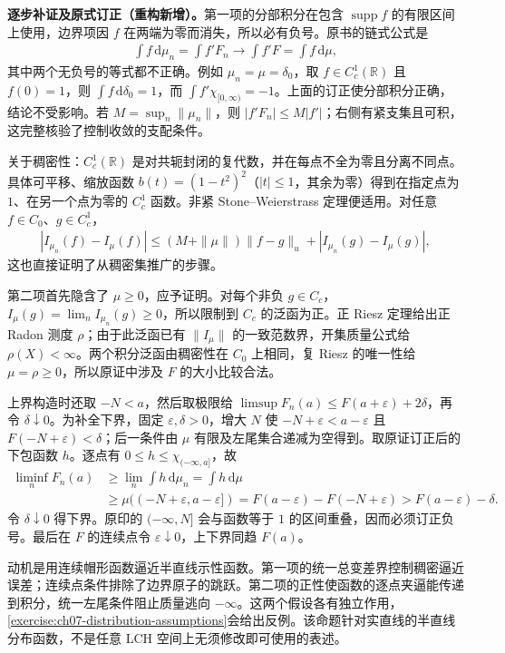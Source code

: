 \documentclass[../../main.tex]{subfiles}
\begin{document}
\begin{remark}
\textbf{逐步补证及原式订正（重构新增）。}第一项的分部积分在包含 $\operatorname{supp}f$ 的有限区间上使用，边界项因 $f$ 在两端为零而消失，所以必有负号。原书的链式公式是
\begin{align*}
\int f\,\mathrm d\mu_n=\int f'F_n\longrightarrow\int f'F=\int f\,\mathrm d\mu,
\end{align*}
其中两个无负号的等式都不正确。例如 $\mu_n=\mu=\delta_0$，取 $f\in C_c^1(\mathbb R)$ 且 $f(0)=1$，则 $\int f\,\mathrm d\delta_0=1$，而 $\int f'\chi_{[0,\infty)}=-1$。上面的订正使分部积分正确，结论不受影响。若 $M=\sup_n\|\mu_n\|$，则 $|f'F_n|\leqslant M|f'|$；右侧有紧支集且可积，这完整核验了控制收敛的支配条件。

关于稠密性：$C_c^1(\mathbb R)$ 是对共轭封闭的复代数，并在每点不全为零且分离不同点。具体可平移、缩放函数 $b(t)=(1-t^2)^2$（$|t|\leqslant1$，其余为零）得到在指定点为 $1$、在另一个点为零的 $C_c^1$ 函数。非紧 Stone--Weierstrass 定理便适用。对任意 $f\in C_0$、$g\in C_c^1$，
\begin{align*}
|I_{\mu_n}(f)-I_\mu(f)|\leqslant(M+\|\mu\|)\|f-g\|_u+|I_{\mu_n}(g)-I_\mu(g)|,
\end{align*}
这也直接证明了从稠密集推广的步骤。

第二项首先隐含了 $\mu\geqslant0$，应予证明。对每个非负 $g\in C_c$，$I_\mu(g)=\lim_nI_{\mu_n}(g)\geqslant0$，所以限制到 $C_c$ 的泛函为正。正 Riesz 定理给出正 Radon 测度 $\rho$；由于此泛函已有 $\|I_\mu\|$ 的一致范数界，开集质量公式给 $\rho(X)<\infty$。两个积分泛函由稠密性在 $C_0$ 上相同，复 Riesz 的唯一性给 $\mu=\rho\geqslant0$，所以原证中涉及 $F$ 的大小比较合法。

上界构造时还取 $-N<a$，然后取极限给 $\limsup F_n(a)\leqslant F(a+\varepsilon)+2\delta$，再令 $\delta\downarrow0$。为补全下界，固定 $\varepsilon,\delta>0$，增大 $N$ 使 $-N+\varepsilon<a-\varepsilon$ 且 $F(-N+\varepsilon)<\delta$；后一条件由 $\mu$ 有限及左尾集合递减为空得到。取原证订正后的下包函数 $h$。逐点有 $0\leqslant h\leqslant\chi_{({-\infty},a]}$，故
\begin{align*}
\liminf_nF_n(a)&\geqslant\lim_n\int h\,\mathrm d\mu_n=\int h\,\mathrm d\mu\\
&\geqslant\mu((-N+\varepsilon,a-\varepsilon])
=F(a-\varepsilon)-F(-N+\varepsilon)>F(a-\varepsilon)-\delta.
\end{align*}
令 $\delta\downarrow0$ 得下界。原印的 $({-\infty},N]$ 会与函数等于 $1$ 的区间重叠，因而必须订正负号。最后在 $F$ 的连续点令 $\varepsilon\downarrow0$，上下界同趋 $F(a)$。

动机是用连续帽形函数逼近半直线示性函数。第一项的统一总变差界控制稠密逼近误差；连续点条件排除了边界原子的跳跃。第二项的正性使函数的逐点夹逼能传递到积分，统一左尾条件阻止质量逃向 $-\infty$。这两个假设各有独立作用，\cref{exercise:ch07-distribution-assumptions}会给出反例。该命题针对实直线的半直线分布函数，不是任意 LCH 空间上无须修改即可使用的表述。
\end{remark}

\end{document}
